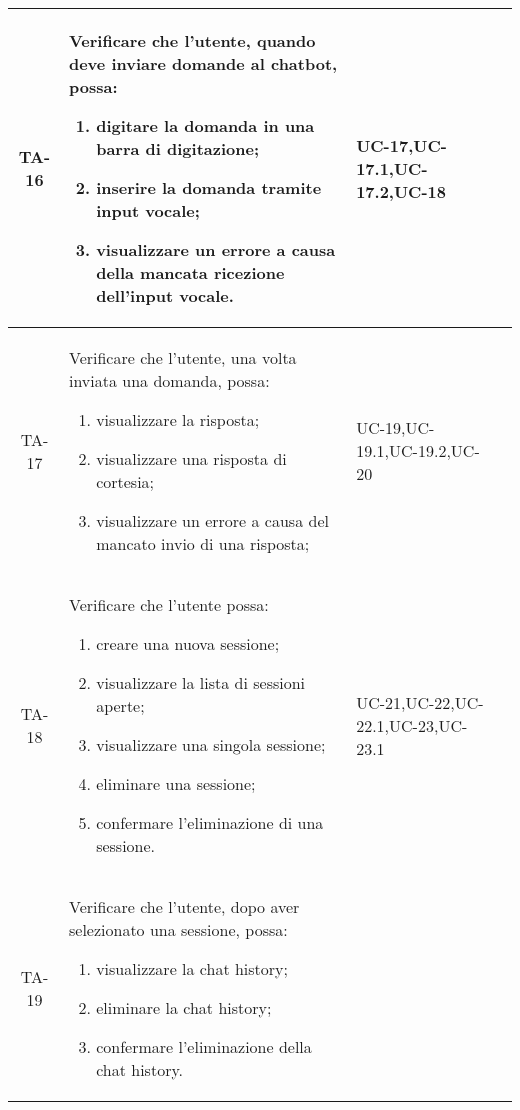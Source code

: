 \begin{xltabular}{\textwidth}{| c | X | X | c |}
    TA-16 & Verificare che l’utente, quando deve inviare domande al chatbot, possa:
    \begin{enumerate}
        \item digitare la domanda in una barra di digitazione;
        \item inserire la domanda tramite input vocale;
        \item visualizzare un errore a causa della mancata ricezione dell'input vocale.
        
    \end{enumerate}& UC-17,\newline UC-17.1,\newline UC-17.2,\newline UC-18 & \textcolor{xmarkcolor}{} \\
    \hline
    TA-17 & Verificare che l’utente, una volta inviata una domanda, possa:
    \begin{enumerate}
        \item visualizzare la risposta;
        \item visualizzare una risposta di cortesia;
        \item visualizzare un errore a causa del mancato invio di una risposta;

    \end{enumerate}& UC-19,\newline UC-19.1,\newline UC-19.2,\newline UC-20 & \textcolor{xmarkcolor}{} \\
    \hline
     TA-18 & Verificare che l’utente possa:
    \begin{enumerate}
        \item creare una nuova sessione;
        \item visualizzare la lista di sessioni aperte;
        \item visualizzare una singola sessione;
        \item eliminare una sessione;
        \item confermare l'eliminazione di una sessione.
        
        
    \end{enumerate}& UC-21,\newline UC-22,\newline UC-22.1,\newline UC-23,\newline UC-23.1 & \textcolor{xmarkcolor}{} \\
    \hline
    TA-19 & Verificare che l'utente, dopo aver selezionato una sessione, possa:
    \begin{enumerate}
        \item visualizzare la chat history;
        \item eliminare la chat history;
        \item confermare l'eliminazione della chat history.
        

\end{enumerate}
\end{xltabular}

